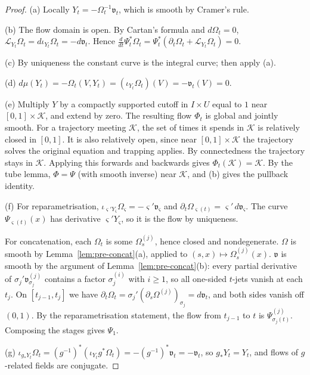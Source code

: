\begin{proof}
(a) Locally $Y_t=-\Omega_t^{-1}\mathfrak v_t$, which is smooth by Cramer's rule.

(b) The flow domain is open. By Cartan's formula and $d\Omega_t=0$, $\mathcal L_{Y_t}\Omega_t=d\iota_{Y_t}\Omega_t=-d\mathfrak v_t$. Hence $\frac d{dt}\Psi_t^*\Omega_t=\Psi_t^*(\partial_t\Omega_t+\mathcal L_{Y_t}\Omega_t)=0$.

(c) By uniqueness the constant curve is the integral curve; then apply (a).

(d) $d\mu(Y_t)=-\Omega_t(V,Y_t)=(\iota_{Y_t}\Omega_t)(V)=-\mathfrak v_t(V)=0$.

(e) Multiply $Y$ by a compactly supported cutoff in $I\times U$ equal to $1$ near $[0,1]\times\mathcal K$, and extend by zero. The resulting flow $\Phi_t$ is global and jointly smooth. For a trajectory meeting $\mathcal K$, the set of times it spends in $\mathcal K$ is relatively closed in $[0,1]$. It is also relatively open, since near $[0,1]\times\mathcal K$ the trajectory solves the original equation and trapping applies. By connectedness the trajectory stays in $\mathcal K$. Applying this forwards and backwards gives $\Phi_t(\mathcal K)=\mathcal K$. By the tube lemma, $\Phi=\Psi$ (with smooth inverse) near $\mathcal K$, and (b) gives the pullback identity.

(f) For reparametrisation, $\iota_{\varsigma'Y_{\varsigma}}\Omega_{\varsigma}=-\varsigma'\mathfrak v_{\varsigma}$ and $\partial_t\Omega_{\varsigma(t)}=\varsigma'\,d\mathfrak v_{\varsigma}$. The curve $\Psi_{\varsigma(t)}(x)$ has derivative $\varsigma'Y_{\varsigma}$, so it is the flow by uniqueness.

For concatenation, each $\Omega_t$ is some $\Omega^{(j)}_s$, hence closed and nondegenerate. $\Omega$ is smooth by Lemma~\ref{lem:pre-concat}(a), applied to $(s,x)\mapsto\Omega^{(j)}_s(x)$. $\mathfrak v$ is smooth by the argument of Lemma~\ref{lem:pre-concat}(b): every partial derivative of $\sigma_j'\mathfrak v^{(j)}_{\sigma_j}$ contains a factor $\sigma_j^{(i)}$ with $i\ge1$, so all one-sided $t$-jets vanish at each $t_j$. On $[t_{j-1},t_j]$ we have $\partial_t\Omega_t=\sigma_j'(\partial_s\Omega^{(j)})_{\sigma_j}=d\mathfrak v_t$, and both sides vanish off $(0,1)$. By the reparametrisation statement, the flow from $t_{j-1}$ to $t$ is $\Psi^{(j)}_{\sigma_j(t)}$. Composing the stages gives $\Psi_1$.

(g) $\iota_{g_*Y_t}\Omega_t=(g^{-1})^*(\iota_{Y_t}g^*\Omega_t)=-(g^{-1})^*\mathfrak v_t=-\mathfrak v_t$, so $g_*Y_t=Y_t$, and flows of $g$-related fields are conjugate.
\end{proof}

